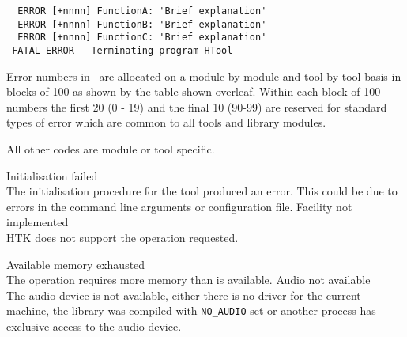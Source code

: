 \begin{verbatim}
  ERROR [+nnnn] FunctionA: 'Brief explanation'
  ERROR [+nnnn] FunctionB: 'Brief explanation'
  ERROR [+nnnn] FunctionC: 'Brief explanation'
 FATAL ERROR - Terminating program HTool
\end{verbatim}

Error numbers in \HTK\ are allocated on a module by module
and tool by tool basis in blocks of 100 as shown by the table shown
overleaf.
Within each block of 100 numbers the first 20 (0 - 19)
and the final 10 (90-99) are reserved for standard types 
of error which are common to all tools and library 
modules.

All other codes are module or tool specific.


\begin{itemize}
 Initialisation failed \\
        The initialisation procedure for the tool produced an
        error. This could be due to errors in the command line
        arguments or configuration file.
 Facility not implemented \\
        HTK does not support the operation requested.

 Available memory exhausted \\
        The operation requires more memory than is available.
 Audio not available \\
        The audio device is not available, either there is no driver for
        the current machine, the library was compiled with \texttt{NO\_AUDIO}
        set or another process has exclusive access to the audio device.


\end{itemize}
